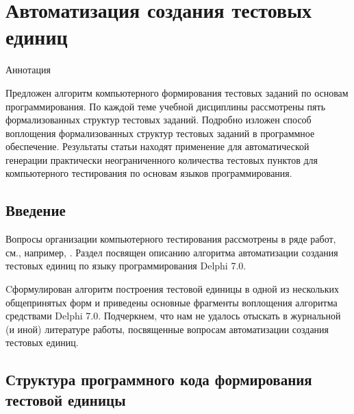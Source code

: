 \chapter{Автоматизация создания тестовых единиц}
Аннотация


Предложен алгоритм компьютерного формирования тестовых заданий по основам программирования. По каждой теме учебной дисциплины рассмотрены пять формализованных структур тестовых заданий. Подробно изложен способ воплощения формализованных структур тестовых заданий в программное обеспечение.
Результаты статьи находят применение для автоматической генерации практически неограниченного количества тестовых пунктов для компьютерного тестирования по основам языков программирования.


\section{Введение}

Вопросы организации компьютерного тестирования рассмотрены в ряде работ, см., например, \cite{Lapt}. Раздел посвящен описанию алгоритма автоматизации создания тестовых единиц по языку программирования Delphi 7.0.
\par\medskip
Cформулирован алгоритм построения тестовой единицы в одной из нескольких общепринятых форм и приведены основные фрагменты воплощения алгоритма средствами Delphi 7.0. Подчеркнем, что нам не удалось отыскать в журнальной (и иной) литературе работы, посвященные вопросам автоматизации создания тестовых единиц.
\section{Структура программного кода формирования тестовой единицы}

